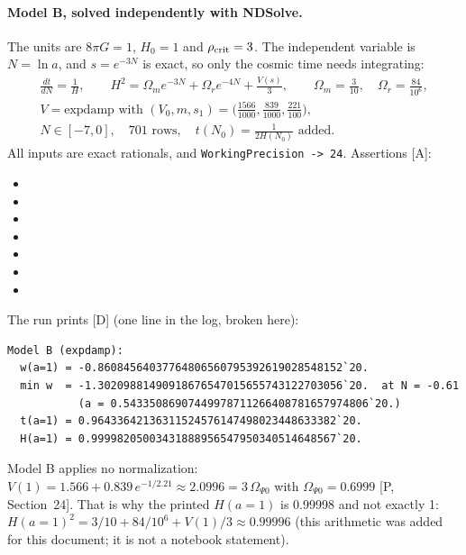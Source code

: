 \paragraph{Model B, solved independently with NDSolve.} The units are $8\pi G=1$, $H_0=1$ and
$\rho_{\rm crit}=3$. The independent variable is $N=\ln a$, and $s=e^{-3N}$ is exact, so only the
cosmic time needs integrating:
\begin{gather}
  \frac{dt}{dN}=\frac1H,\qquad H^2=\Omega_m e^{-3N}+\Omega_r e^{-4N}+\frac{V(s)}{3},\qquad
  \Omega_m=\tfrac{3}{10},\quad \Omega_r=\tfrac{84}{10^6},\\
  V=\text{expdamp with }(V_0,m,s_1)=\bigl(\tfrac{1566}{1000},\tfrac{839}{1000},\tfrac{221}{100}\bigr),\\
  N\in[-7,0],\quad 701\text{ rows},\quad t(N_0)=\tfrac{1}{2H(N_0)}\text{ added}.
\end{gather}
All inputs are exact rationals, and \texttt{WorkingPrecision -> 24}. Assertions [A]:
\begin{itemize}
  \item {}
  \item {}
  \item {}
  \item {}
  \item {}
  \item %
        \allowbreak{}\allowbreak{}
  \item {}
\end{itemize}
The run prints [D] (one line in the log, broken here):
\begin{footnotesize}
\begin{verbatim}
Model B (expdamp):
  w(a=1) = -0.86084564037764806560795392619028548152`20.
  min w  = -1.30209881490918676547015655743122703056`20.  at N = -0.61
           (a = 0.54335086907449978711266408781657974806`20.)
  t(a=1) = 0.96433642136311524576147498023448633382`20.
  H(a=1) = 0.99998205003431888956547950340514648567`20.
\end{verbatim}
\end{footnotesize}
Model B applies no normalization: $V(1)=1.566+0.839\,e^{-1/2.21}\approx2.0996=3\,\Omega_{\Psi0}$
with $\Omega_{\Psi0}=0.6999$ [P, Section~24]. That is why the printed $H(a{=}1)$ is 0.99998 and
not exactly 1: $H(a{=}1)^2=3/10+84/10^6+V(1)/3\approx0.99996$ (this arithmetic was added for this
document; it is not a notebook statement).

